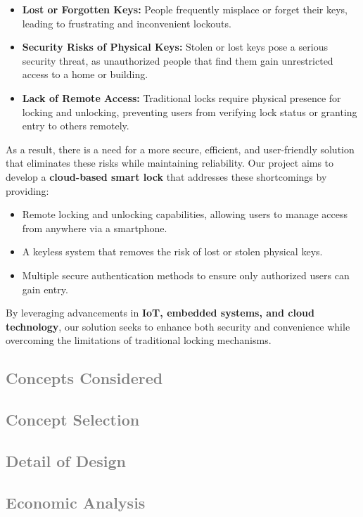 \documentclass[a4paper,12pt]{report}
\begin{document}
\begin{itemize}
    \item \textbf{Lost or Forgotten Keys:} People frequently misplace or forget their keys, leading to frustrating and inconvenient lockouts.
    \item \textbf{Security Risks of Physical Keys:} Stolen or lost keys pose a serious security threat, as unauthorized people that find them gain unrestricted access to a home or building.
    \item \textbf{Lack of Remote Access:} Traditional locks require physical presence for locking and unlocking, preventing users from verifying lock status or granting entry to others remotely.
\end{itemize}

As a result, there is a need for a more secure, efficient, and user-friendly solution that eliminates these risks while maintaining reliability. Our project aims to develop a \textbf{cloud-based smart lock} that addresses these shortcomings by providing:

\begin{itemize}
    \item Remote locking and unlocking capabilities, allowing users to manage access from anywhere via a smartphone.
    \item A keyless system that removes the risk of lost or stolen physical keys.
    \item Multiple secure authentication methods to ensure only authorized users can gain entry.
\end{itemize}

By leveraging advancements in \textbf{IoT, embedded systems, and cloud technology}, our solution seeks to enhance both security and convenience while overcoming the limitations of traditional locking mechanisms.

\subsection{\textcolor{gray}{Concepts Considered}}
\subsection{\textcolor{gray}{Concept Selection}}
\subsection{\textcolor{gray}{Detail of Design}}
\subsection{\textcolor{gray}{Economic Analysis}}
\end{document}
